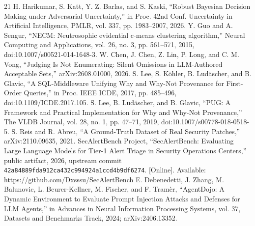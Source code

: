 \documentclass[journal,compsoc]{IEEEtran}
\begin{document}
\begin{thebibliography}{21}
 H. Harikumar, S. Katt, Y. Z. Barlas, and S. Kaski, ``Robust Bayesian Decision Making under Adversarial Uncertainty,'' in Proc. 42nd Conf. Uncertainty in Artificial Intelligence, PMLR, vol. 337, pp. 1983--2007, 2026.
 Y. Guo and A. Sengur, ``NECM: Neutrosophic evidential c-means clustering algorithm,'' Neural Computing and Applications, vol. 26, no. 3, pp. 561--571, 2015, doi:10.1007/s00521-014-1648-3.
 W. Chen, J. Chen, Z. Lin, P. Long, and C. M. Vong, ``Judging Is Not Enumerating: Silent Omissions in LLM-Authored Acceptable Sets,'' arXiv:2608.01000, 2026.
 S. Lee, S. K{\"o}hler, B. Lud{\"a}scher, and B. Glavic, ``A SQL-Middleware Unifying Why and Why-Not Provenance for First-Order Queries,'' in Proc. IEEE ICDE, 2017, pp. 485--496, doi:10.1109/ICDE.2017.105.
 S. Lee, B. Lud{\"a}scher, and B. Glavic, ``PUG: A Framework and Practical Implementation for Why and Why-Not Provenance,'' The VLDB Journal, vol. 28, no. 1, pp. 47--71, 2019, doi:10.1007/s00778-018-0518-5.
 S. Reis and R. Abreu, ``A Ground-Truth Dataset of Real Security Patches,'' arXiv:2110.09635, 2021.
 SecAlertBench Project, ``SecAlertBench: Evaluating Large Language Models for Tier-1 Alert Triage in Security Operations Centers,'' public artifact, 2026, upstream commit \texttt{42a84889\allowbreak fda912ca\allowbreak{}432c9949\allowbreak{}24a1ccd4\allowbreak b9df6274}. [Online]. Available: \url{https://github.com/Dxsssu/SecAlertBench}
 E. Debenedetti, J. Zhang, M. Balunovic, L. Beurer-Kellner, M. Fischer, and F. Tram\`er, ``AgentDojo: A Dynamic Environment to Evaluate Prompt Injection Attacks and Defenses for LLM Agents,'' in Advances in Neural Information Processing Systems, vol. 37, Datasets and Benchmarks Track, 2024; arXiv:2406.13352.
\end{thebibliography}
\end{document}
